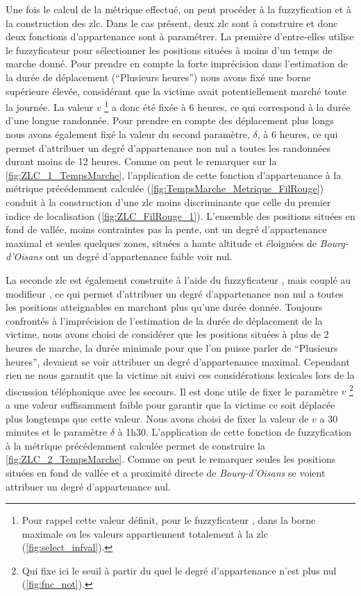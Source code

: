 Une fois le calcul de la métrique effectué, on peut procéder à la
fuzzyfication et à la construction des \ac{zlc}. Dans le cas présent,
deux \ac{zlc} sont à construire et donc deux fonctions d'appartenance
sont à paramétrer. La première d'entre-elles utilise le fuzzyficateur
 pour sélectionner les positions situées à moins
d'un temps de marche donné. Pour prendre en compte la forte
imprécision dans l'estimation de la durée de déplacement
(\enquote{Plusieurs heures}) nous avons fixé une borne supérieure
élevée, considérant que la victime avait potentiellement marché toute
la journée. La valeur \(v\) \footnote{Pour rappel cette valeur
  définit, pour le fuzzyficateur , dans la borne
  maximale ou les valeurs appartiennent totalement à la \ac{zlc}
  (\autoref{fig:select_infval}).} a donc été fixée à 6 heures, ce qui
correspond à la durée d'une longue randonnée. Pour prendre en compte
des déplacement plus longs nous avons également fixé la valeur du
second paramètre, \(\delta\), à 6 heures, ce qui permet d'attribuer un
degré d'appartenance non nul a toutes les randonnées durant moins de
12 heures. Comme on peut le remarquer sur la
\autoref{fig:ZLC_1_TempsMarche}, l’application de cette fonction
d'appartenance à la métrique précédemment calculée
(\autoref{fig:TempsMarche_Metrique_FilRouge}) conduit à la
construction d'une \ac{zlc} moins discriminante que celle du premier
indice de localisation (\autoref{fig:ZLC_FilRouge_1}). L'ensemble des
positions situées en fond de vallée, moins contraintes pas la pente,
ont un degré d'appartenance maximal et seules quelques zones, situées
a haute altitude et éloignées de \emph{Bourg-d'Oisans} ont un degré
d'appartenance faible voir nul.

La seconde \ac{zlc} est également construite à l'aide du fuzzyficateur
, mais couplé au modifieur , ce
qui permet d'attribuer un degré d'appartenance non nul a toutes les
positions atteignables en marchant plus qu'une durée donnée. Toujours
confrontés à l'imprécision de l'estimation de la durée de déplacement
de la victime, nous avons choisi de considérer que les positions
situées à plus de 2 heures de marche, la durée minimale pour que l'on
puisse parler de \enquote{Plusieurs heures}, devaient se voir
attribuer un degré d'appartenance maximal. Cependant rien ne nous
garantit que la victime ait suivi ces considérations lexicales lors de
la discussion téléphonique avec les secours. Il est donc utile de
fixer le paramètre \(v\) \footnote{Qui fixe ici le seuil à partir du
  quel le degré d'appartenance n'est plus nul
  (\autoref{fig:fnc_not}).} a une valeur suffisamment faible pour
garantir que la victime ce soit déplacée plus longtemps que cette
valeur. Nous avons choisi de fixer la valeur de \(v\) a 30 minutes et
le paramètre \(\delta\) à 1h30. L’application de cette fonction de
fuzzyfication à la métrique précédemment calculée permet de construire
la \autoref{fig:ZLC_2_TempsMarche}. Comme on peut le remarquer seules
les positions situées en fond de vallée et a proximité directe de
\emph{Bourg-d'Oisans} se voient attribuer un degré d'appartenance nul.

